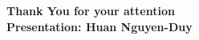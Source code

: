 \documentclass[
	11pt, %
]{beamer}
\begin{document}

\begin{frame}[plain] %
	\begin{center}
		{\Huge \textbf{Thank You for your attention}} \\
		\vspace{30px}
		{\textbf{Presentation: Huan Nguyen-Duy}}
            
	\end{center}
\end{frame}

\end{document}
